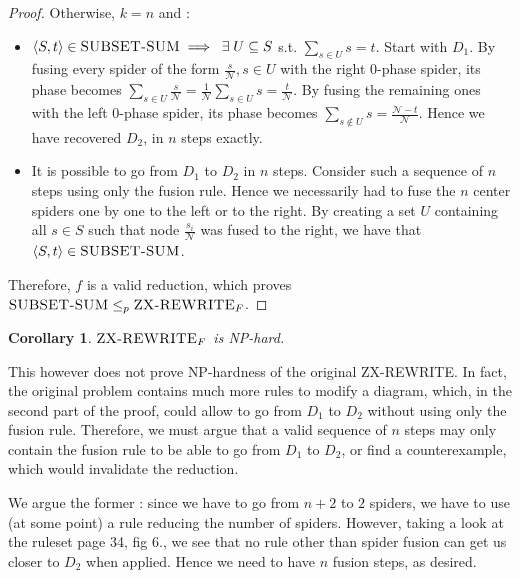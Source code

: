 \documentclass[journal,onecolumn]{IEEEtran}
\newtheorem{corollary}[theorem]{Corollary}
\begin{document}
\begin{proof}
Otherwise, $k = n$ and :
\begin{itemize}
	\item[($\Rightarrow$)] $\left< S, t \right> \in \textsc{SUBSET-SUM} \implies \; \exists \; U \subseteq S$ s.t. $ \sum_{s \in U} s = t$. Start with $D_1$. By fusing every spider of the form $\frac{s}{\mathcal{N}}, s \in U$ with the right 0-phase spider, its phase becomes $\sum_{s \in U} \frac{s}{\mathcal{N}} = \frac{1}{\mathcal{N}} \sum_{s \in U} s = \frac{t}{\mathcal{N}}$. By fusing the remaining ones with the left 0-phase spider, its phase becomes $\sum_{s \notin U} s = \frac{\mathcal{N} - t}{\mathcal{N}}$. Hence we have recovered $D_2$, in $n$ steps exactly.
	\item[($\Leftarrow$)] It is possible to go from $D_1$ to $D_2$ in $n$ steps. Consider such a sequence of $n$ steps using only the fusion rule. Hence we necessarily had to fuse the $n$ center spiders one by one to the left or to the right. By creating a set $U$ containing all  $s \in S$ such that node $\frac{s_i}{\mathcal{N}}$ was fused to the right, we have that $\left< S, t \right> \in \textsc{SUBSET-SUM}$.
\end{itemize}


Therefore, $f$ is a valid reduction, which proves $\textsc{SUBSET-SUM} \leq_p \textsc{ZX-REWRITE}_F$.

\end{proof}

\begin{corollary}
	$\textsc{ZX-REWRITE}_F$ is \textsc {NP}-hard.
	
\end{corollary}

This however does not prove \textsc{NP}-hardness of the original \textsc{ZX-REWRITE}. In fact, the original problem contains much more rules to modify a diagram, which, in the second part of the proof, could allow to go from $D_1$ to $D_2$ without using only the fusion rule. Therefore, we must argue that a valid sequence of $n$ steps may only contain the fusion rule to be able to go from $D_1$ to $D_2$, or find a counterexample, which would invalidate the reduction.

We argue the former : since we have to go from $n+2$ to $2$ spiders, we have to use (at some point) a rule reducing the number of spiders. However, taking a look at the ruleset \cite{ZXcompleteness} page 34, fig 6., we see that no rule other than spider fusion can get us closer to $D_2$ when applied. Hence we need to have $n$ fusion steps, as desired.
\end{document}

